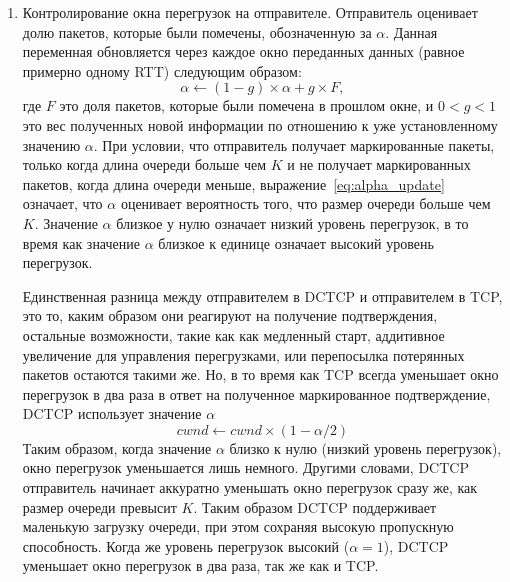 \documentclass[14pt, a4paper,oneside]{extarticle}
\begin{document}
\begin{enumerate}
\item
Контролирование окна перегрузок на отправителе.
Отправитель оценивает долю пакетов, которые были помечены, обозначенную за $\alpha$. Данная переменная обновляется через каждое окно переданных данных (равное примерно одному RTT) следующим образом:
\begin{equation} \label{eq:alpha_update}
\alpha \leftarrow (1 - g) \times \alpha + g \times F,
\end{equation}
где $F$ это доля пакетов, которые были помечена в прошлом окне, и $0 < g < 1$ это вес полученных новой информации по отношению к уже установленному значению $\alpha$. При условии, что отправитель получает маркированные пакеты, только когда длина очереди больше чем $K$ и не получает маркированных пакетов, когда длина очереди меньше, выражение~\eqref{eq:alpha_update} означает, что $\alpha$ оценивает вероятность того, что размер очереди больше чем $K$. Значение $\alpha$ близкое у нулю означает низкий уровень перегрузок, в то время как значение $\alpha$ близкое к единице означает высокий уровень перегрузок.

Единственная разница между отправителем в DCTCP и отправителем в TCP, это то, каким образом они реагируют на получение подтверждения, остальные возможности, такие как как медленный старт, аддитивное увеличение для управления перегрузками, или перепосылка потерянных пакетов остаются такими же.
Но, в то время как TCP всегда уменьшает окно перегрузок в два раза в ответ на полученное маркированное подтверждение, DCTCP использует значение $\alpha$
\begin{equation} \label{eq:cwnd}
cwnd \leftarrow cwnd \times (1 - \alpha/2)
\end{equation}
Таким образом, когда значение $\alpha$ близко к нулю (низкий уровень перегрузок), окно перегрузок уменьшается лишь немного. Другими словами, DCTCP отправитель начинает аккуратно уменьшать окно перегрузок сразу же, как размер очереди превысит $K$. Таким образом DCTCP поддерживает маленькую загрузку очереди, при этом сохраняя высокую пропускную способность. Когда же уровень перегрузок высокий ($\alpha = 1$), DCTCP уменьшает окно перегрузок в два раза, так же как и TCP.
\end{enumerate}
\newpage
\end{document}

